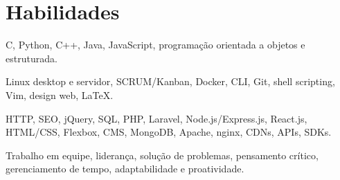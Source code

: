 \section{Habilidades}
{C, Python, C++, Java, JavaScript, programação orientada a objetos e estruturada.}

{Linux desktop e servidor, SCRUM/Kanban, Docker, CLI, Git, shell scripting, Vim, design web, {\LaTeX}.}

{HTTP, SEO, jQuery, SQL, PHP, Laravel, Node.js/Express.js, React.js, HTML/CSS, Flexbox, CMS, MongoDB, Apache, nginx, CDNs, APIs, SDKs.}

{Trabalho em equipe, liderança, solução de problemas, pensamento crítico, gerenciamento de tempo, adaptabilidade e proatividade.}
